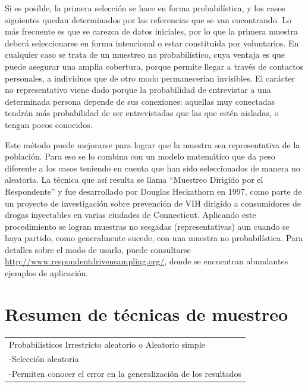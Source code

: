 \documentclass[]{book}
\begin{document}
Si es posible, la primera selección se hace en forma probabilística, y
los casos siguientes quedan determinados por las referencias que se van
encontrando. Lo más frecuente es que se carezca de datos iniciales, por
lo que la primera muestra deberá seleccionarse en forma intencional o
estar constituida por voluntarios. En cualquier caso se trata de un
muestreo no probabilístico, cuya ventaja es que puede asegurar una
amplia cobertura, porque permite llegar a través de contactos
personales, a individuos que de otro modo permanecerían invisibles. El
carácter no representativo viene dado porque la probabilidad de
entrevistar a una determinada persona depende de sus conexiones:
aquellas muy conectadas tendrán más probabilidad de ser entrevistadas
que las que estén aisladas, o tengan pocos conocidos.

Este método puede mejorarse para lograr que la muestra sea
representativa de la población. Para eso se lo combina con un modelo
matemático que da peso diferente a los casos teniendo en cuenta que han
sido seleccionados de manera no aleatoria. La técnica que así resulta se
llama ``Muestreo Dirigido por el Respondente'' y fue desarrollado por
Douglas Heckathorn en 1997, como parte de un proyecto de investigación
sobre prevención de VIH dirigido a consumidores de drogas inyectables en
varias ciudades de Connecticut. Aplicando este procedimiento se logran
muestras no sesgadas (representativas) aun cuando se haya partido, como
generalmente sucede, con una muestra no probabilística. Para detalles
sobre el modo de usarlo, puede consultarse
\url{http://www.respondentdrivensampling.org/}, donde se encuentran abundantes
ejemplos de aplicación.

\hypertarget{resumen-de-tuxe9cnicas-de-muestreo}{%
\section{Resumen de técnicas de muestreo}\label{resumen-de-tuxe9cnicas-de-muestreo}}

\begin{longtable}[]{@{}l@{}}
\toprule
\endhead
\begin{minipage}[t]{0.96\columnwidth}\raggedright
Probabilísticos Irrestricto aleatorio o Aleatorio simple\strut
\end{minipage}\tabularnewline
\begin{minipage}[t]{0.96\columnwidth}\raggedright
-Selección aleatoria\strut
\end{minipage}\tabularnewline
\begin{minipage}[t]{0.96\columnwidth}\raggedright
-Permiten conocer el error en la generalización de los resultados\strut
\end{minipage}\tabularnewline
\bottomrule
\end{longtable}
\end{document}
